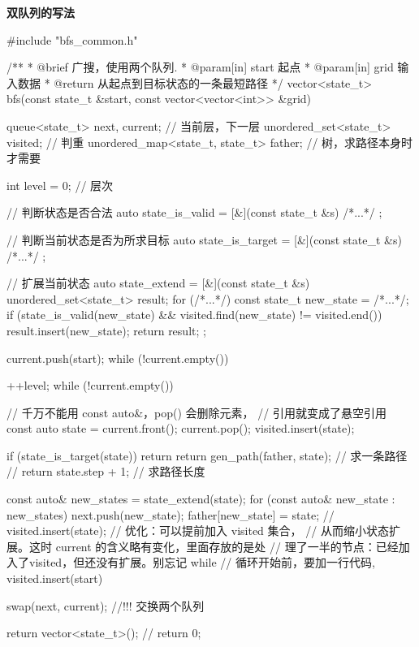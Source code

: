 \textbf{双队列的写法}
\begin{Codex}[label=bfs_template1.cpp]
#include "bfs_common.h"

/**
 * @brief 广搜，使用两个队列.
 * @param[in] start 起点
 * @param[in] grid 输入数据
 * @return 从起点到目标状态的一条最短路径
 */
vector<state_t> bfs(const state_t &start, const vector<vector<int>> &grid) {
    queue<state_t> next, current; // 当前层，下一层
    unordered_set<state_t> visited; // 判重
    unordered_map<state_t, state_t> father; // 树，求路径本身时才需要

    int level = 0;  // 层次

    // 判断状态是否合法
    auto state_is_valid = [&](const state_t &s) { /*...*/ };

    // 判断当前状态是否为所求目标
    auto state_is_target = [&](const state_t &s) { /*...*/ };

    // 扩展当前状态
    auto state_extend = [&](const state_t &s) {
        unordered_set<state_t> result;
        for (/*...*/) {
            const state_t new_state = /*...*/;
            if (state_is_valid(new_state) && 
                    visited.find(new_state) != visited.end()) {
                result.insert(new_state);
            }
        }
        return result;
    };

    current.push(start);
    while (!current.empty()) {
        ++level;
        while (!current.empty()) {
            // 千万不能用 const auto&，pop() 会删除元素，
            // 引用就变成了悬空引用
            const auto state = current.front();
            current.pop();
            visited.insert(state);

            if (state_is_target(state)) {
                return return gen_path(father, state); // 求一条路径
                // return state.step + 1; // 求路径长度
            }

            const auto& new_states = state_extend(state);
            for (const auto& new_state : new_states) {
                next.push(new_state);
                father[new_state] = state;
                // visited.insert(state); // 优化：可以提前加入 visited 集合，
                // 从而缩小状态扩展。这时 current 的含义略有变化，里面存放的是处
                // 理了一半的节点：已经加入了visited，但还没有扩展。别忘记 while
                // 循环开始前，要加一行代码, visited.insert(start)
            }
        }
        swap(next, current); //!!! 交换两个队列
    }

    return vector<state_t>();
    // return 0;
}
\end{Codex}


